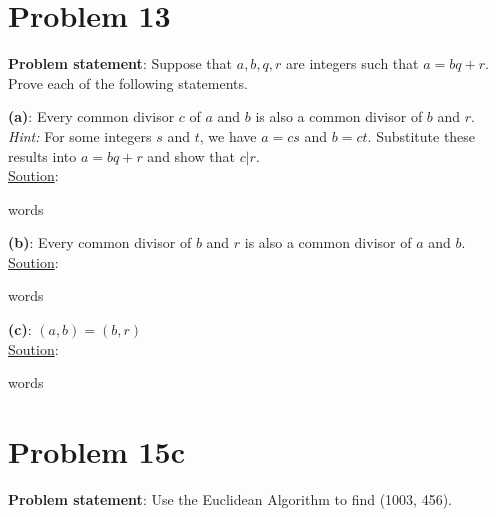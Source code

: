 \documentclass{article} %
\begin{document}
\newpage

\section*{Problem 13}


\textbf{Problem statement}: Suppose that $a, b, q, r$ are integers such that $a = bq + r$.  Prove each of the following statements.
\\

\begin{addmargin}[1em]{0em}
\textbf{(a)}: Every common divisor $c$ of $a$ and $b$ is also a common divisor of $b$ and $r$.
\\ \hfill \break
\textit{Hint:} For some integers $s$ and $t$, we have $a = cs$ and $b = ct$.  Substitute these results into $a = bq + r$ and show that $c|r$.
\\ \hfill \break
\underline{Soution}:
\begin{addmargin}[1em]{0em}
words
\end{addmargin}
\end{addmargin}
\hfill \break

\begin{addmargin}[1em]{0em}
\textbf{(b)}: Every common divisor of $b$ and $r$ is also a common divisor of $a$ and $b$.
\\ \hfill \break
\underline{Soution}:
\begin{addmargin}[1em]{0em}
words
\end{addmargin}
\end{addmargin}
\hfill \break

\begin{addmargin}[1em]{0em}
\textbf{(c)}: $(a,b)=(b,r)$
\\ \hfill \break
\underline{Soution}:
\begin{addmargin}[1em]{0em}
words
\end{addmargin}
\end{addmargin}
\hfill \break

\newpage

\section*{Problem 15c}


\textbf{Problem statement}: Use the Euclidean Algorithm to find (1003, 456).
\\
\end{document}
